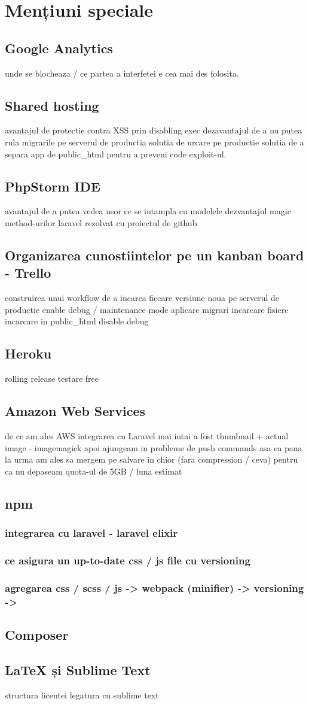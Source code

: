 \section{Mențiuni speciale}
	\subsection{Google Analytics}
	unde se blocheaza / ce partea a interfetei e cea mai des folosita.
	\subsection{Shared hosting}
		avantajul de protectie contra XSS prin disabling exec
		dezavantajul de a nu putea rula migrarile pe serverul de productia
		solutia de urcare pe productie
		solutia de a separa app de public\_html pentru a preveni code exploit-ul.
	\subsection{PhpStorm IDE}
	\label{sec:phpstorm}
		avantajul de a putea vedea usor ce se intampla cu modelele
		dezvantajul magic method-urilor laravel rezolvat cu proiectul de github.
	\subsection{Organizarea cunostiintelor pe un kanban board - Trello}
		construirea unui workflow de a incarca fiecare versiune noua pe serverul de productie
			enable debug / maintenance mode
			aplicare migrari
			incarcare fisiere
			incarcare in public\_html
			disable debug
	\subsection{Heroku}
		rolling release
		testare
		free
	\subsection{Amazon Web Services}
		de ce am ales AWS
		integrarea cu Laravel
		mai intai a fost thumbnail + actual image - imagemagick
		apoi ajungeam in probleme de push commands
		asa ca pana la urma am ales sa mergem pe salvare in chior (fara compression / ceva)
			pentru ca nu depaseam quota-ul de 5GB / luna estimat
	\subsection{npm}
		\subsubsection{integrarea cu laravel - laravel elixir}
		\subsubsection{ce asigura un up-to-date css / js file cu versioning}
		\subsubsection{agregarea css / scss / js -> webpack (minifier) -> versioning ->}
	\subsection{Composer}
	\subsection{LaTeX și Sublime Text}
		structura licentei
		legatura cu sublime text

